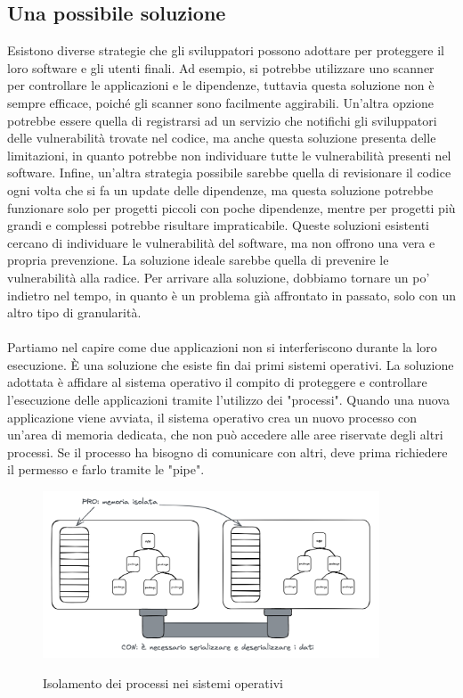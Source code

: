 \subsection{Una possibile soluzione}
Esistono diverse strategie che gli sviluppatori possono adottare per proteggere il loro software e gli utenti finali. Ad
esempio, si potrebbe utilizzare uno scanner per controllare le applicazioni e le dipendenze, tuttavia questa soluzione
non è sempre efficace, poiché gli scanner sono facilmente aggirabili. Un'altra opzione potrebbe essere quella di
registrarsi ad un servizio che notifichi gli sviluppatori delle vulnerabilità trovate nel codice, ma anche questa
soluzione presenta delle limitazioni, in quanto potrebbe non individuare tutte le vulnerabilità presenti nel software.
Infine, un'altra strategia possibile sarebbe quella di revisionare il codice ogni volta che si fa un update delle
dipendenze, ma questa soluzione potrebbe funzionare solo per progetti piccoli con poche dipendenze, mentre per progetti
più grandi e complessi potrebbe risultare impraticabile. Queste soluzioni esistenti cercano di individuare le
vulnerabilità
del software, ma non offrono una vera e propria prevenzione. La soluzione ideale sarebbe quella di prevenire le
vulnerabilità alla radice. Per arrivare alla soluzione, dobbiamo tornare un po' indietro nel tempo, in quanto è un
problema già affrontato in passato, solo con un altro tipo di granularità. \\
\\
Partiamo nel capire come due applicazioni non si interferiscono durante la loro esecuzione. È una soluzione che esiste
fin dai primi sistemi operativi. La soluzione adottata è affidare al sistema operativo il compito di proteggere e
controllare l'esecuzione delle applicazioni tramite l'utilizzo dei "processi". Quando una nuova applicazione viene
avviata, il sistema operativo crea un nuovo processo con un'area di memoria dedicata, che non può accedere alle aree
riservate degli altri processi. Se il processo ha bisogno di comunicare con altri, deve prima richiedere il permesso e
farlo tramite le "pipe".
\begin{figure}[H]
    \centering
    \captionsetup{justification=centering}
    \includegraphics[width=10cm]{./chapters/2.wasi-in-depth/images/2.process_isolation.png}
    \label{process_isolation}
    \caption{Isolamento dei processi nei sistemi operativi}
\end{figure}
